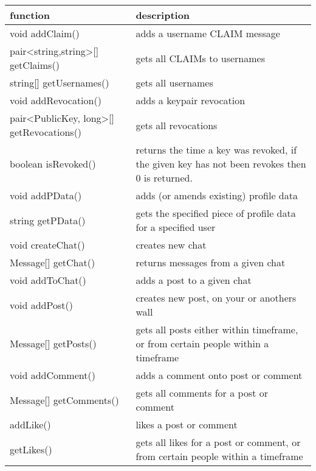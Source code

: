 \begin{table}[h]
    \centering
    \begin{tabular}{p{5cm}p{9cm}}
    function                             & description\\ \hline
    
    void                  addClaim()     & adds a username CLAIM message\\
    pair<string,string>[] getClaims()    & gets all CLAIMs to usernames\\
    string[]              getUsernames() & gets all usernames\\
    
    void                    addRevocation()  & adds a keypair revocation\\
    pair<PublicKey, long>[] getRevocations() & gets all revocations\\
    boolean                 isRevoked()      & returns the time a key was revoked, if the given key has not been revokes then 0 is returned.\\
    
    void   addPData() & adds (or amends existing) profile data\\
    string getPData() & gets the specified piece of profile data for a specified user\\
    
    void createChat()   & creates new chat\\
    Message[] getChat() & returns messages from a given chat\\
    void addToChat()    & adds a post to a given chat\\
    
    void      addPost()  & creates new post, on your or anothers wall\\
    Message[] getPosts() & gets all posts either within timeframe, or from certain people within a timeframe\\
    
    void addComment()       & adds a comment onto post or comment\\
    Message[] getComments() & gets all comments for a post or comment\\
    
    addLike()        & likes a post or comment\\
    getLikes()       & gets all likes for a post or comment, or from certain people within a timeframe\\
    

\end{tabular}
\end{table}
